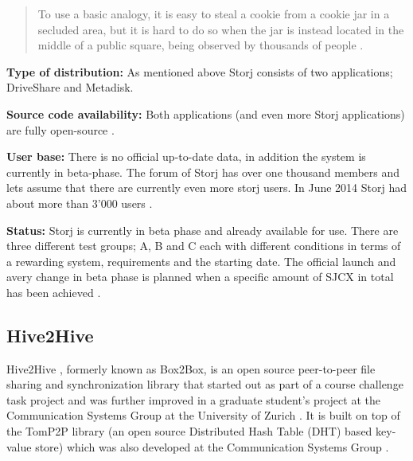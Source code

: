 \begin{quotation}
To use a basic analogy, it is easy to steal a cookie from a cookie jar in a secluded area, but it is hard to do so when the jar is instead located in the middle of a public square, being observed by thousands of people \cite{storj:PDF}.
\end{quotation}

\textbf{Type of distribution:} As mentioned above Storj consists of two applications; DriveShare and Metadisk.

\textbf{Source code availability:} Both applications (and even more Storj applications) are fully open-source \cite{storj:github}.

\textbf{User base:} There is no official up-to-date data, in addition the system is currently in beta-phase. The forum of Storj has over one thousand members \cite{storj:forum} and lets assume that there are currently even more storj users. In June 2014 Storj had about more than 3'000 users \cite{storj:crowdsale}.

\textbf{Status:} Storj is currently in beta phase and already available for use. There are three different test groups; A, B and C each with different conditions in terms of a rewarding system, requirements and the starting date. The official launch and avery change in beta phase is planned when a specific amount of SJCX in total has been achieved \cite {storj:earlyaccess}.

\subsection{Hive2Hive}
Hive2Hive \cite{hive2hive}, formerly known as Box2Box, is an open source peer-to-peer file sharing and synchronization library that started out as part of a course challenge task project and was further improved in a graduate student's project at the Communication Systems Group at the University of Zurich \cite{hive2hive:about}. It is built on top of the TomP2P library (an open source Distributed Hash Table (DHT) based key-value store) which was also developed at the Communication Systems Group \cite{tomp2p}.

